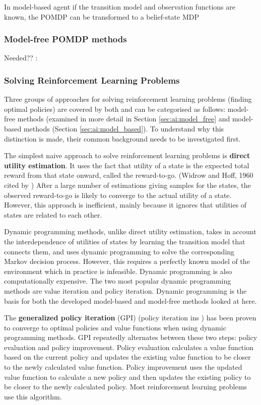 In model-based agent if the transition model and observation functions are
known, the POMDP can be transformed to a belief-state MDP

\subsubsection{Model-free POMDP methods}




Needed?? :
\subsubsection{Solving Reinforcement Learning Problems}

Three groups of approaches for solving reinforcement learning problems (finding
optimal policies) are covered by both \textcite{Russell2010ai+modern} and
\textcite{Sutton1998ai+reinforcement} can be categorised as follows: model-
free methods (examined in more detail in Section \ref{sec:ai:model_free} and
model-based methods (Section \ref{sec:ai:model_based}). To understand why this
distinction is made, their common background needs to be investigated first.

The simplest naive approach to solve reinforcement learning problems is
\textbf{direct utility estimation}. It uses the fact that utility of a state is
the expected total reward from that state onward, called the reward-to-go.
(Widrow and Hoff, 1960 cited by \textcite{Russell2010ai+modern}) After a large
number of estimations giving samples for the states, the observed reward-to-go
is likely to converge to the actual utility of a state. However, this approach
is inefficient, mainly because it ignores that utilities of states are related
to each other. \parencite{Russell2010ai+modern}

Dynamic programming methods, unlike direct utility estimation, takes in
account the interdependence of utilities of states by learning the transition
model that connects them, and uses dynamic programming to solve the
corresponding Markov decision process. However, this requires a perfectly known
model of the environment which in practice is infeasible. Dynamic programming
is also computationally expensive. The two most popular dynamic programming
methods are value iteration and policy iteration. Dynamic programming is the
basis for both the developed model-based and model-free methods looked at here.
\parencite{Sutton1998ai+reinforcement}

The \textbf{generalized policy iteration} (GPI) (policy iteration ins
\textcite{Russell2010ai+modern}) has been proven to converge to optimal
policies and value functions when using dynamic programming methods. GPI
repeatedly alternates between these two steps: policy evaluation and policy
improvement. Policy evaluation calculates a value function based on the current
policy and updates the existing value function to be closer to the newly
calculated value function. Policy improvement uses the updated value function
to calculate a new policy and then updates the existing policy to be closer to
the newly calculated policy. Most reinforcement learning problems use this
algorithm. \parencite{Sutton1998ai+reinforcement}


